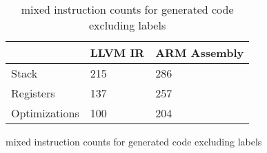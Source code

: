 \begin{table}[h!]
\centering
\begin{tabular}{p{}p{}p{}}
  \hline
 & LLVM IR & ARM Assembly \\ 
  \hline
Stack & 215 & 286 \\ 
  Registers & 137 & 257 \\ 
  Optimizations & 100 & 204 \\ 
   \hline
\end{tabular}
\caption{mixed instruction counts for generated code excluding labels}
\caption{mixed instruction counts for generated code excluding labels}
\end{table}
